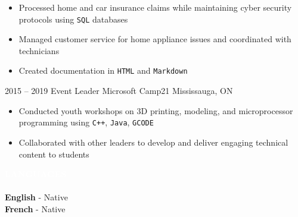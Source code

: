 \documentclass[9pt]{src/developercv} %
\begin{document}
\begin{entrylist}
{				\begin{itemize}
					\item Processed home and car insurance claims while maintaining cyber security protocols using \texttt{SQL} databases
					\item Managed customer service for home appliance issues and coordinated with technicians
					\item Created documentation in \texttt{HTML} and \texttt{Markdown}
				\end{itemize}
			}
		\atsentry
			{2015 -- 2019}
			{Event Leader}
			{Microsoft Camp21}
			{Mississauga, ON}
			{
				\vspace{-1.0\baselineskip}
				\begin{itemize}
					\item Conducted youth workshops on 3D printing, modeling, and microprocessor programming using \texttt{C++}, \texttt{Java}, \texttt{GCODE}
					\item Collaborated with other leaders to develop and deliver engaging technical content to students
				\end{itemize}
			}
	\end{entrylist}

	\begin{minipage}[t]{\textwidth}
		\colorbox{sky600}{\textcolor{white}{\LARGE\MakeUppercase{\textbf{Languages}}}}\\\\%
		\textbf{English} - Native\\
		\textbf{French} - Native
	\end{minipage}

	\pagebreak
\end{document}
